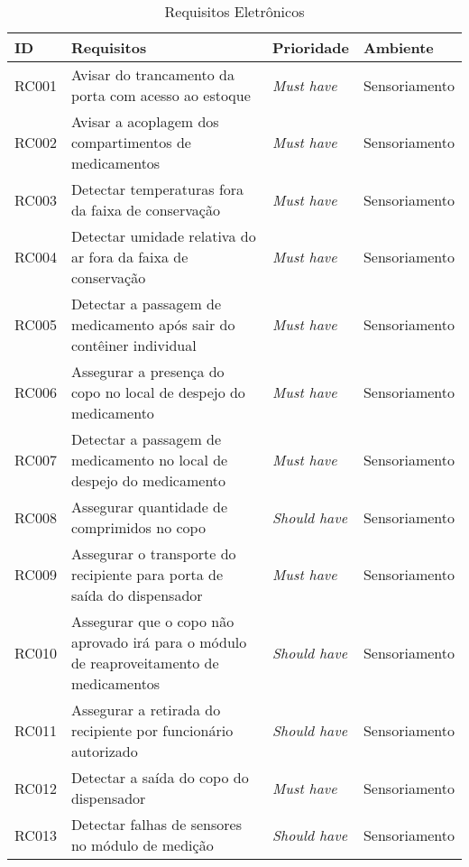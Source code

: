 \begin{table}[H]
    \centering
    \caption{Requisitos Eletrônicos}
    \label{tab:req_ele_sensor1}
	\begin{adjustbox}{max width = \textwidth}
        \begin{tabular}{|L{1.5cm}|L{8.5cm}|C{2.5cm}|C{3.5cm}|}
        \hline
        \textbf{ID} & \textbf{Requisitos} & \textbf{Prioridade} & \textbf{Ambiente} \\ \hline
        RC001 & Avisar do trancamento da porta com acesso ao estoque & \textit{Must have} & Sensoriamento\\ \hline
        RC002 & Avisar a acoplagem dos compartimentos de medicamentos & \textit{Must have} & Sensoriamento\\ \hline
        RC003 & Detectar temperaturas fora da faixa de conservação & \textit{Must have} & Sensoriamento\\ \hline
        RC004 & Detectar umidade relativa do ar fora da faixa de conservação & \textit{Must have} & Sensoriamento\\ \hline
        RC005 & Detectar a passagem de medicamento após sair do contêiner individual &  \textit{Must have} & Sensoriamento\\ \hline
        RC006 & Assegurar a presença do copo no local de despejo do medicamento & \textit{Must have} & Sensoriamento\\ \hline
        RC007 & Detectar a passagem de medicamento no local de despejo do medicamento & \textit{Must have} & Sensoriamento\\ \hline
        RC008 & Assegurar quantidade de comprimidos no copo & \textit{Should have} & Sensoriamento\\ \hline
        RC009 & Assegurar o transporte do recipiente para porta de saída do dispensador & \textit{Must have} & Sensoriamento\\ \hline
        RC010 & Assegurar que o copo não aprovado irá para o módulo de reaproveitamento de medicamentos & \textit{Should have} & Sensoriamento\\ \hline
        RC011 & Assegurar a retirada do recipiente por funcionário autorizado & \textit{Should have} & Sensoriamento\\ \hline
        RC012 & Detectar a saída do copo do dispensador & \textit{Must have} & Sensoriamento\\ \hline
        RC013 & Detectar falhas de sensores no módulo de medição & \textit{Should have} & Sensoriamento\\ \hline

\end{tabular}
\end{adjustbox}
\end{table}
